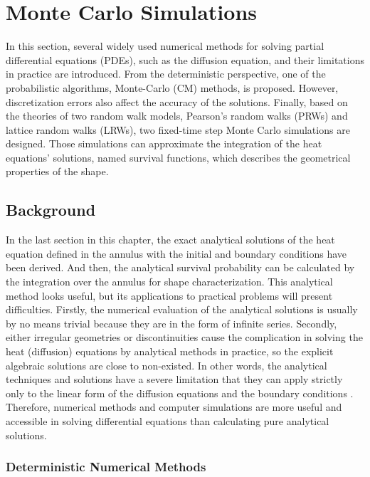 \section{Monte Carlo Simulations}

In this section, several widely used numerical methods for solving
partial differential equations (PDEs), such as the diffusion equation,
and their limitations in practice are introduced. From the
deterministic perspective, one of the probabilistic algorithms,
Monte-Carlo (CM) methods, is proposed. However, discretization errors
also affect the accuracy of the solutions. Finally, based on the
theories of two random walk models, Pearson's random walks (PRWs) and
lattice random walks (LRWs), two fixed-time step Monte Carlo
simulations are designed. Those simulations can approximate the
integration of the heat equations' solutions, named survival
functions, which describes the geometrical properties of the shape.


\subsection{Background}

In the last section in this chapter, the exact analytical solutions of
the heat equation defined in the annulus with the initial and boundary
conditions have been derived. And then, the analytical survival
probability can be calculated by the integration over the annulus for
shape characterization. This analytical method looks useful, but its
applications to practical problems will present difficulties. Firstly,
the numerical evaluation of the analytical solutions is usually by no
means trivial because they are in the form of infinite
series. Secondly, either irregular geometries or discontinuities cause
the complication in solving the heat (diffusion) equations by
analytical methods in practice, so the explicit algebraic solutions
are close to non-existed. In other words, the analytical techniques
and solutions have a severe limitation that they can apply strictly
only to the linear form of the diffusion equations and the boundary
conditions \cite{crank1979mathematics}. Therefore, numerical methods
and computer simulations are more useful and accessible in solving
differential equations than calculating pure analytical solutions.

\subsubsection{Deterministic Numerical Methods}

